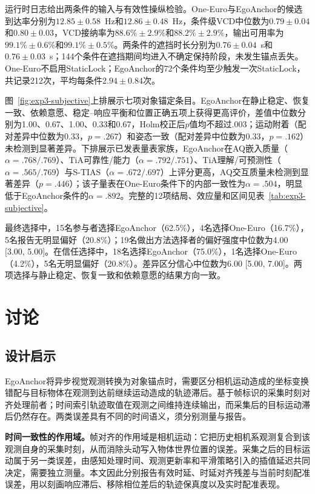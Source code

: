 \documentclass[review]{vgtc}
\begin{document}
运行时日志给出两条件的输入与有效性操纵检验。One-Euro与EgoAnchor的候选到达率分别为$12.85\pm0.58$~Hz和$12.86\pm0.48$~Hz，条件级VCD中位数为$0.79\pm0.04$和$0.80\pm0.03$，VCD接纳率为$88.6\%\pm2.9\%$和$88.2\%\pm2.9\%$，输出可用率为$99.1\%\pm0.6\%$和$99.1\%\pm0.5\%$。两条件的遮挡时长分别为$0.76\pm0.04$~s和$0.76\pm0.03$~s；144个条件在遮挡期间均进入不确定保持阶段，未发生锚点丢失。One-Euro不启用StaticLock；EgoAnchor的72个条件均至少触发一次StaticLock，共记录212次，平均每条件$2.94\pm0.84$次。

图~\ref{fig:exp3-subjective}上排展示七项对象锚定条目。EgoAnchor在静止稳定、恢复一致、依赖意愿、稳定--响应平衡和位置正确五项上获得更高评价，差值中位数分别为1.00、0.67、1.00、0.33和0.67，Holm校正后$p$值均不超过.003；运动附着（配对差异中位数为0.33，$p=.267$）和姿态一致（配对差异中位数为0.33，$p=.162$）未检测到显著差异。下排展示已发表量表家族，EgoAnchor在AQ嵌入质量（$\alpha = .768/.769$）、TiA可靠性/能力（$\alpha = .792/.751$）、TiA理解/可预测性（$\alpha = .565/.769$）与S-TIAS（$\alpha = .672/.697$）上评分更高，AQ交互质量未检测到显著差异（$p=.446$）；该子量表在One-Euro条件下的内部一致性为$\alpha = .504$，明显低于EgoAnchor条件的$\alpha = .892$。完整的12项结局、效应量和区间见表~\ref{tab:exp3-subjective}。

最终选择中，15名参与者选择EgoAnchor（62.5\%），4名选择One-Euro（16.7\%），5名报告无明显偏好（20.8\%）；19名做出方法选择者的偏好强度中位数为4.00 [3.00, 5.00]。在信任选择中，18名选择EgoAnchor（75.0\%），1名选择One-Euro（4.2\%），5名无明显偏好（20.8\%）。差异区分信心中位数为6.00 [5.00, 7.00]。两项选择与静止稳定、恢复一致和依赖意愿的结果方向一致。

\section{讨论}\label{sec:discussion}

\subsection{设计启示}

EgoAnchor将异步视觉观测转换为对象锚点时，需要区分相机运动造成的坐标变换错配与目标物体在观测到达前继续运动造成的轨迹滞后。基于帧标识的采集时刻对齐处理前者；时间索引轨迹取值在观测之间维持连续输出，而采集后的目标运动滞后仍然存在。两类误差具有不同的时间语义，须分别测量与报告。

\textbf{时间一致性的作用域。}帧对齐的作用域是相机运动：它把历史相机系观测复合到该观测自身的采集时刻，从而消除头动写入物体世界位置的误差。采集之后的目标运动属于另一类误差，由感知处理时间、观测更新率和平滑策略引入的插值延迟共同决定，需要独立测量。本文因此分别报告有效时延、时延对齐残差与当前时刻配准误差，用以刻画响应滞后、移除相位差后的轨迹保真度以及实时配准表现。
\end{document}
